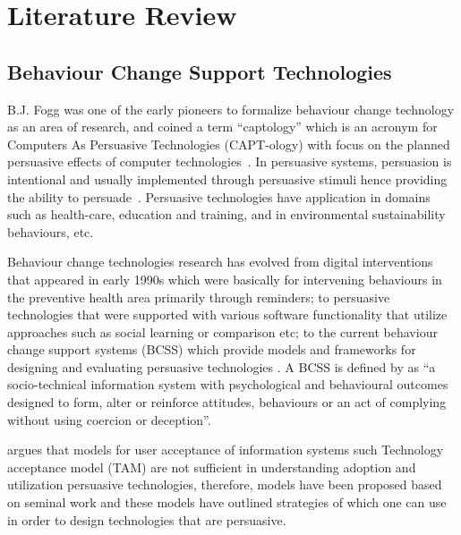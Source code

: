 
\chapter{Literature Review} %

\label{literaturereview} %


\section{Behaviour Change Support Technologies}
B.J. Fogg was one of the early pioneers to formalize behaviour change technology as an area of research, and coined a term “captology” which is an acronym for Computers As Persuasive Technologies (CAPT-ology) with focus on the planned persuasive effects of computer technologies~\citep{fogg1999persuasive}. In persuasive systems, persuasion is intentional and usually implemented through persuasive stimuli hence providing the ability to persuade~\citep{hamari2014persuasive}. Persuasive technologies have application in domains such as health-care, education and training, and in environmental sustainability behaviours, etc.

Behaviour change technologies research has evolved from digital interventions that appeared in early 1990s which were basically for intervening behaviours in the preventive health area primarily through reminders; to persuasive technologies that were supported with various software functionality that utilize approaches such as social learning or comparison etc; to the current behaviour change support systems (BCSS) which provide models and frameworks for designing and evaluating persuasive technologies \cite{langrial2012digital}. A BCSS is defined by \cite{Oinas-Kukkonen:foundation}  as ``a socio-technical information system with psychological and behavioural outcomes designed to form, alter or reinforce attitudes, behaviours or an act of complying without using coercion or deception''.

\cite{Oinas-kukkonen:psd} argues that models for user acceptance of information systems such Technology acceptance model (TAM) are not sufficient in understanding adoption and utilization persuasive technologies, therefore, models have been proposed based on seminal work and these models have outlined strategies of which one can use in order to design technologies that are persuasive.  

